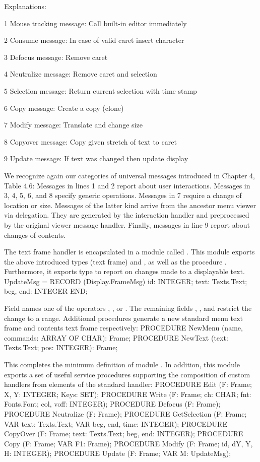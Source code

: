 \noindent Explanations: %

\item{1} Mouse tracking message: Call built-in editor immediately
\item{2} Consume message: In case of valid caret insert character
\item{3} Defocus message: Remove caret
\item{4} Neutralize message: Remove caret and selection
\item{5} Selection message: Return current selection with time stamp
\item{6} Copy message: Create a copy (clone)
\item{7} Modify message: Translate and change size
\item{8} Copyover message: Copy given stretch of text to caret
\item{9} Update message: If text was changed then update display

\noindent We recognize again our categories of universal messages introduced in Chapter 4, Table 4.6: Messages in lines 1 and 2 report about user interactions. Messages in 3, 4, 5, 6, and 8 specify generic operations. Messages in 7 require a change of location or size. Messages of the latter kind arrive from the ancestor menu viewer via delegation. They are generated by the interaction handler and preprocessed by the original viewer message handler. Finally, messages in line 9 report about changes of contents.

The text frame handler is encapsulated in a module called . This module exports the above introduced types  (text frame) and , as well as the procedure . Furthermore, it exports type  to report on changes made to a displayable text.
\begintt
UpdateMsg = RECORD (Display.FrameMsg)
  id: INTEGER;
  text: Texts.Text;
  beg, end: INTEGER
END;
\endtt

\noindent Field  names one of the operators , , or . The remaining fields , , and  restrict the change to a range. Additional procedures generate a new standard menu text frame and contents text frame respectively:
\begintt
PROCEDURE NewMenu (name, commands: ARRAY OF CHAR): Frame;
PROCEDURE NewText (text: Texts.Text; pos: INTEGER): Frame;
\endtt

\noindent This completes the minimum definition of module . In addition, this module exports a set of useful service procedures supporting the composition of custom handlers from elements of the standard handler:
\begintt
PROCEDURE Edit (F: Frame; X, Y: INTEGER; Keys: SET);
PROCEDURE Write (F: Frame; ch: CHAR; fnt: Fonts.Font;
                 col, voff: INTEGER);
PROCEDURE Defocus (F: Frame);
PROCEDURE Neutralize (F: Frame);
PROCEDURE GetSelection (F: Frame; VAR text: Texts.Text;
                        VAR beg, end, time: INTEGER);
PROCEDURE CopyOver (F: Frame; text: Texts.Text; beg, end: INTEGER);
PROCEDURE Copy (F: Frame; VAR F1: Frame);
PROCEDURE Modify (F: Frame; id, dY, Y, H: INTEGER);
PROCEDURE Update (F: Frame; VAR M: UpdateMsg);
\endtt

